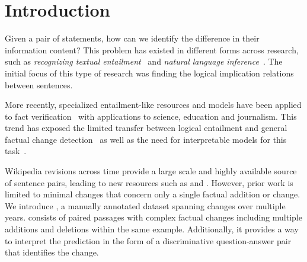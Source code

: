 \section{Introduction}

Given a pair of statements, how can we identify the difference in their information content? %
This problem has existed in different forms across \nlp{} research, such as \emph{recognizing textual entailment}~ \cite{dagan-etal-2010-recognizing} and
\emph{natural language inference}~\cite{bowman-etal-2015-large}. The initial focus of this type of research was finding the logical implication relations between sentences.



More recently, specialized entailment-like resources and models have been applied to fact verification~\citep{ws-2018-fact} with applications to science, education and journalism. This trend has exposed the limited transfer
between logical entailment and general factual change detection~\citep{thorne-etal-2018-fever} as well as the need for interpretable models for this task~\citep{kumar-talukdar-2020-nile}.

Wikipedia revisions across time provide a large scale and highly available source of sentence pairs, leading to new resources such as \wikiatomicedits{} \cite{faruqui-etal-2018-wikiatomicedits} and \vitaminc{} \cite{schuster-etal-2021-get}. However, prior work is limited to minimal changes that concern only a single factual addition or change.
We introduce \dataset{}, a manually annotated dataset spanning changes over multiple years. \dataset{} consists of paired passages with complex factual changes including multiple additions and deletions within the same example. 
Additionally, it provides a way to interpret the prediction in the form of a discriminative question-answer pair that identifies the change.

